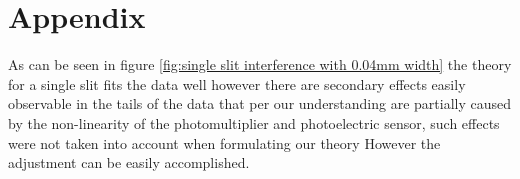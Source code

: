 \section{Appendix}
As can be seen in figure \ref{fig:single slit interference with 0.04mm width} the theory for a single slit fits the data well however there are
secondary effects easily observable in the tails of the data that per our understanding are partially caused by the non-linearity of the
photomultiplier and photoelectric sensor, such effects were not taken into account when formulating our theory
However the adjustment can be easily accomplished.



